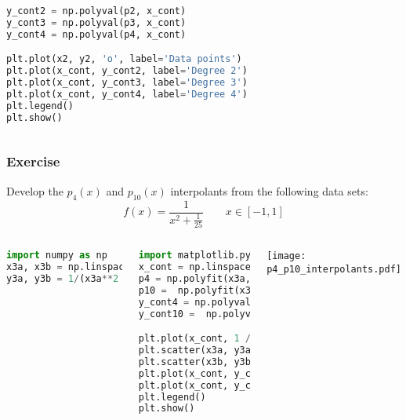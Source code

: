 \begin{frame}[fragile]
\begin{columns}
\begin{lstlisting}[language=Python,basicstyle=\tiny]
y_cont2 = np.polyval(p2, x_cont)
y_cont3 = np.polyval(p3, x_cont)
y_cont4 = np.polyval(p4, x_cont)

plt.plot(x2, y2, 'o', label='Data points')
plt.plot(x_cont, y_cont2, label='Degree 2')
plt.plot(x_cont, y_cont3, label='Degree 3')
plt.plot(x_cont, y_cont4, label='Degree 4')
plt.legend()
plt.show()
   \end{lstlisting}
  \end{columns}
\end{frame}


\begin{frame}[fragile]
  \frametitle{Exercise}
  \footnotesize\selectfont
  Develop the {$p_4(x)$} and {$p_{10}(x)$} interpolants from the following data sets: 
  \vspace*{1em}
\[
f(x)=\frac{1}{x^2+\frac{1}{25}} \qquad x \in [-1,1]
\]
\begin{columns}
  \begin{lstlisting}[language=Python, basicstyle=\scriptsize]
import numpy as np
x3a, x3b = np.linspace(-1, 1, 5), np.linspace(-1, 1, 11)
y3a, y3b = 1/(x3a**2 + 1/25), 1/(x3b**2 + 1/25)
  \end{lstlisting}\pause
  \begin{lstlisting}[language=Python, basicstyle=\scriptsize]
import matplotlib.pyplot as plt
x_cont = np.linspace(-1, 1, 1001)
p4 = np.polyfit(x3a, y3a, 4)
p10 =  np.polyfit(x3b, y3b, 10)
y_cont4 = np.polyval(p4, x_cont)
y_cont10 =  np.polyval(p10, x_cont)

plt.plot(x_cont, 1 / (x_cont**2 + 1/25), label='f(x)')
plt.scatter(x3a, y3a, marker='o', label='p4 data')
plt.scatter(x3b, y3b, marker='x', label='p10 data')
plt.plot(x_cont, y_cont4, label='p4(x)')
plt.plot(x_cont, y_cont10, label='p10(x)')
plt.legend()
plt.show()
  \end{lstlisting}
  \texttt{[image: p4\_p10\_interpolants.pdf]}
\end{columns}
\end{frame}


